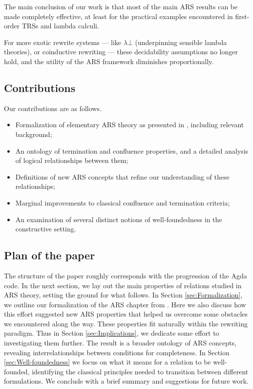 The main conclusion of our work is that most of the main ARS results can be made completely effective, at least for the practical examples encountered in first-order TRSs and lambda calculi.

For more exotic rewrite systems --- like $\lambda \bot$ (underpinning sensible lambda theories), or coinductive rewriting ---
these decidability assumptions no longer hold, and the utility of the ARS framework diminishes proportionally.

\subsection{Contributions}
Our contributions are as follows.
\begin{itemize}
  \item Formalization of elementary ARS theory as presented in
  \cite{Terese}, including relevant background;
  \item An ontology of termination and confluence properties, and a detailed analysis of logical relationships between them;
  \item Definitions of new ARS concepts that refine our understanding of these relationships;
  \item Marginal improvements to classical confluence and termination criteria;
  \item An examination of several distinct notions of well-foundedness
  in the constructive setting.
\end{itemize}

\subsection{Plan of the paper}

The structure of the paper roughly corresponds with the progression of the Agda code.
In the next section, we lay out the main properties of relations studied in ARS theory,
setting the ground for what follows.  In Section \ref{sec:Formalization}, we
outline our formalization of the ARS chapter from \cite{Terese}.
Here we also discuss how this effort suggested new ARS properties that helped us overcome some obstacles we encountered along the way.  These properties fit naturally within the rewriting paradigm.  Thus in Section \ref{sec:Implications}, we dedicate some effort to investigating them further.  The result is a broader ontology of ARS concepts, revealing interrelationships between conditions for completeness.  In Section \ref{sec:Well-foundedness} we focus on what it means for a relation to be well-founded, identifying the classical principles needed to transition between different formulations.
We conclude with a brief summary and suggestions for future work.
